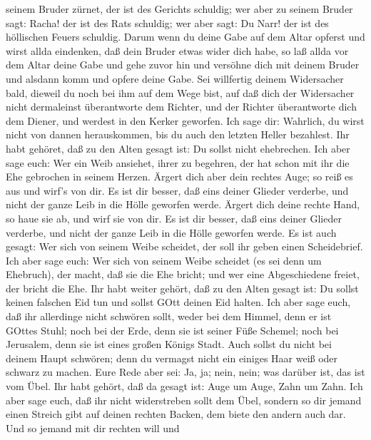 seinem Bruder zürnet, der ist des Gerichts schuldig; wer aber zu seinem
Bruder sagt: Racha! der ist des Rats schuldig; wer aber sagt: Du Narr!
der ist des höllischen Feuers schuldig.  Darum wenn du
deine Gabe auf dem Altar opferst und wirst allda eindenken, daß dein
Bruder etwas wider dich habe,  so laß allda vor dem Altar
deine Gabe und gehe zuvor hin und versöhne dich mit deinem Bruder und
alsdann komm und opfere deine Gabe.  Sei willfertig deinem
Widersacher bald, dieweil du noch bei ihm auf dem Wege bist, auf daß
dich der Widersacher nicht dermaleinst überantworte dem Richter, und der
Richter überantworte dich dem Diener, und werdest in den Kerker
geworfen.  Ich sage dir: Wahrlich, du wirst nicht von
dannen herauskommen, bis du auch den letzten Heller bezahlest.
 Ihr habt gehöret, daß zu den Alten gesagt ist: Du sollst
nicht ehebrechen.  Ich aber sage euch: Wer ein Weib
ansiehet, ihrer zu begehren, der hat schon mit ihr die Ehe gebrochen in
seinem Herzen.  Ärgert dich aber dein rechtes Auge; so reiß
es aus und wirf's von dir. Es ist dir besser, daß eins deiner Glieder
verderbe, und nicht der ganze Leib in die Hölle geworfen werde.
 Ärgert dich deine rechte Hand, so haue sie ab, und wirf
sie von dir. Es ist dir besser, daß eins deiner Glieder verderbe, und
nicht der ganze Leib in die Hölle geworfen werde.  Es ist
auch gesagt: Wer sich von seinem Weibe scheidet, der soll ihr geben
einen Scheidebrief.  Ich aber sage euch: Wer sich von
seinem Weibe scheidet (es sei denn um Ehebruch), der macht, daß sie die
Ehe bricht; und wer eine Abgeschiedene freiet, der bricht die Ehe.
 Ihr habt weiter gehört, daß zu den Alten gesagt ist: Du
sollst keinen falschen Eid tun und sollst GOtt deinen Eid halten.
 Ich aber sage euch, daß ihr allerdinge nicht schwören
sollt, weder bei dem Himmel, denn er ist GOttes Stuhl; 
noch bei der Erde, denn sie ist seiner Füße Schemel; noch bei Jerusalem,
denn sie ist eines großen Königs Stadt.  Auch sollst du
nicht bei deinem Haupt schwören; denn du vermagst nicht ein einiges Haar
weiß oder schwarz zu machen.  Eure Rede aber sei: Ja, ja;
nein, nein; was darüber ist, das ist vom Übel.  Ihr habt
gehört, daß da gesagt ist: Auge um Auge, Zahn um Zahn.  Ich
aber sage euch, daß ihr nicht widerstreben sollt dem Übel, sondern so
dir jemand einen Streich gibt auf deinen rechten Backen, dem biete den
andern auch dar.  Und so jemand mit dir rechten will und
